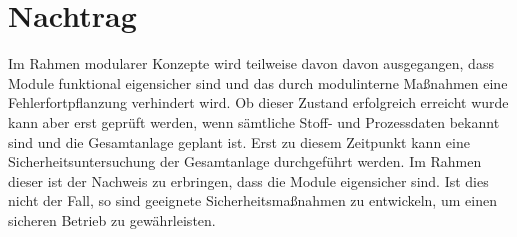 
\section{Nachtrag}
Im Rahmen modularer Konzepte wird teilweise davon davon ausgegangen, dass Module funktional eigensicher sind und das durch modulinterne Ma\ss{}nahmen eine Fehlerfortpflanzung verhindert wird. \cite[S. 4]{Urbas_2012a} Ob dieser Zustand erfolgreich erreicht wurde kann aber erst gepr\"uft werden, wenn s\"amtliche Stoff- und Prozessdaten bekannt sind und die Gesamtanlage geplant ist. Erst zu diesem Zeitpunkt kann eine Sicherheitsuntersuchung der Gesamtanlage durchgef\"uhrt werden. Im Rahmen dieser ist der Nachweis zu erbringen, dass die Module eigensicher sind. Ist dies nicht der Fall, so sind geeignete Sicherheitsma\ss{}nahmen zu entwickeln, um einen sicheren Betrieb zu gew\"ahrleisten.  